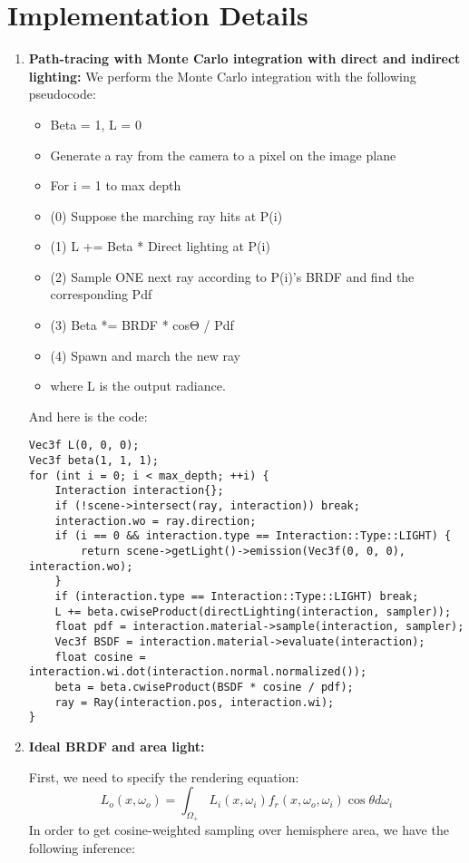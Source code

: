\documentclass[acmtog]{acmart}
\begin{document}
\section{Implementation Details}
\begin{enumerate}
	\setlength{\parindent}{2em}
	\item {\bf Path-tracing with Monte Carlo integration with direct and indirect lighting:}
	We perform the Monte Carlo integration with the following pseudocode:
	\begin{itemize}
		\item Beta = 1, L = 0
		\item Generate a ray from the camera to a pixel on the image plane  
		\item For i = 1 to max depth  
		\item (0) Suppose the marching ray hits at P(i)
		\item (1) L += Beta * Direct lighting at P(i)  
		\item (2) Sample ONE next ray according to P(i)'s BRDF and find the corresponding Pdf
		\item (3) Beta *= BRDF * cosΘ / Pdf
		\item (4) Spawn and march the new ray  
		\item where L is the output radiance.
	\end{itemize}
	And here is the code:
	\begin{lstlisting}
Vec3f L(0, 0, 0);
Vec3f beta(1, 1, 1);
for (int i = 0; i < max_depth; ++i) {
	Interaction interaction{};
	if (!scene->intersect(ray, interaction)) break;
	interaction.wo = ray.direction;
	if (i == 0 && interaction.type == Interaction::Type::LIGHT) {
		return scene->getLight()->emission(Vec3f(0, 0, 0), interaction.wo);
	}
	if (interaction.type == Interaction::Type::LIGHT) break;
	L += beta.cwiseProduct(directLighting(interaction, sampler));
	float pdf = interaction.material->sample(interaction, sampler);
	Vec3f BSDF = interaction.material->evaluate(interaction);
	float cosine = interaction.wi.dot(interaction.normal.normalized());
	beta = beta.cwiseProduct(BSDF * cosine / pdf);
	ray = Ray(interaction.pos, interaction.wi);
}
	\end{lstlisting}
	\item {\bf Ideal BRDF and area light:}
	\par First, we need to specify the rendering equation:
	\[L_{o}(x,\omega_o)=\int_{\Omega_+}L_{i}(x,\omega_i)f_r(x,\omega_o,\omega_i)\cos\theta d\omega_i\]
	In order to get cosine-weighted sampling over hemisphere area, we have the following inference:

\end{enumerate}
\end{document}
